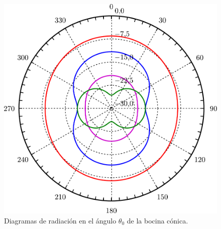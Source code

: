 \begin{figure}[H]
\centering
\includegraphics[scale = 0.5]{Figures/Estudio/estudio_42}
\caption{Diagramas de radiación en el ángulo $\theta_0$ de la bocina cónica.}
\label{fig_estudio:42}
\end{figure}
